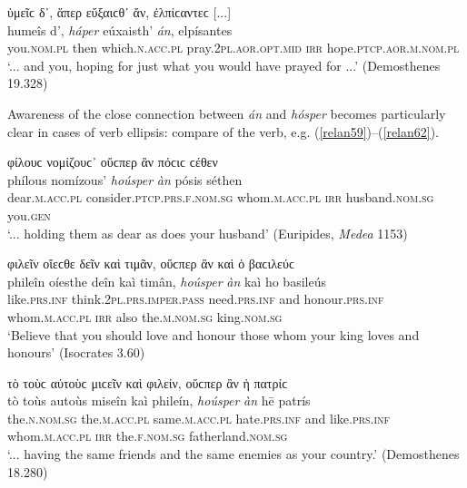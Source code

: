 \begin{exe}
\ex ὑμεῖϲ δ᾽, ἅπερ εὔξαιϲθ᾽ ἄν, ἐλπίϲαντεϲ {[}...{]}\\
\gll humeîs d', \emph{háper} eúxaisth' \emph{án}, elpísantes\\
you.\textsc{nom.pl} then which.\textsc{n.acc.pl} pray.\textsc{2pl.aor.opt.mid} \textsc{irr} hope.\textsc{ptcp.aor.m.nom.pl}\\
\trans `... and you, hoping for just what you would have prayed for ...' (Demosthenes 19.328)
\label{relan58}
\end{exe}

Awareness of the close connection between \emph{án} and \emph{hósper} becomes particularly clear in cases of verb ellipsis: compare  of the  verb, e.g. (\ref{relan59})--(\ref{relan62}).

\begin{exe}
\ex φίλουϲ νομίζουϲ᾽ οὕϲπερ ἂν πόϲιϲ ϲέθεν\\
\gll phílous nomízous' \emph{hoúsper} \emph{àn} pósis séthen\\
dear.\textsc{m.acc.pl} consider.\textsc{ptcp.prs.f.nom.sg} whom.\textsc{m.acc.pl} \textsc{irr} husband.\textsc{nom.sg} you.\textsc{gen}\\
\trans `... holding them as dear as does your husband' (Euripides, \textit{Medea} 1153)
\label{relan59}
\end{exe}

\begin{exe}
\ex φιλεῖν οἴεϲθε δεῖν καὶ τιμᾶν, οὕϲπερ ἂν καὶ ὁ βαϲιλεύϲ\\
\gll phileîn oíesthe deîn kaì timân, \emph{hoúsper} \emph{àn} kaì ho basileús\\
like.\textsc{prs.inf} think.\textsc{2pl.prs.imper.pass} need.\textsc{prs.inf} and honour.\textsc{prs.inf} whom.\textsc{m.acc.pl} \textsc{irr} also the.\textsc{m.nom.sg} king.\textsc{nom.sg}\\
\trans `Believe that you should love and honour those whom your king loves and honours' (Isocrates 3.60)
\label{relan60}
\end{exe}

\begin{exe}
\ex τὸ τοὺϲ αὐτοὺϲ μιϲεῖν καὶ φιλείν, οὕϲπερ ἂν ἡ πατρίϲ\\
\gll tò toùs autoùs miseîn kaì phileín, \emph{hoúsper} \emph{àn} hē patrís\\ 
the.\textsc{n.nom.sg} the.\textsc{m.acc.pl} same.\textsc{m.acc.pl} hate.\textsc{prs.inf} and like.\textsc{prs.inf} whom.\textsc{m.acc.pl} \textsc{irr} the.\textsc{f.nom.sg} fatherland.\textsc{nom.sg}\\
\trans `... having the same friends and the same enemies as your country.' (Demosthenes 18.280)
\label{relan61}
\end{exe}

